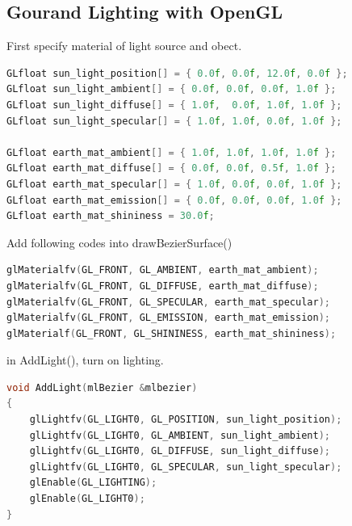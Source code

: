 \documentclass[acmtog]{acmart}
\begin{document}
\subsection{Gourand Lighting with OpenGL}
First specify material of light source and obect.
\begin{lstlisting}[frame=single,breaklines=true,language=c++,basicstyle=\footnotesize\ttfamily]
GLfloat sun_light_position[] = { 0.0f, 0.0f, 12.0f, 0.0f };
GLfloat sun_light_ambient[] = { 0.0f, 0.0f, 0.0f, 1.0f };
GLfloat sun_light_diffuse[] = { 1.0f,  0.0f, 1.0f, 1.0f };
GLfloat sun_light_specular[] = { 1.0f, 1.0f, 0.0f, 1.0f };

GLfloat earth_mat_ambient[] = { 1.0f, 1.0f, 1.0f, 1.0f };
GLfloat earth_mat_diffuse[] = { 0.0f, 0.0f, 0.5f, 1.0f };
GLfloat earth_mat_specular[] = { 1.0f, 0.0f, 0.0f, 1.0f };
GLfloat earth_mat_emission[] = { 0.0f, 0.0f, 0.0f, 1.0f };
GLfloat earth_mat_shininess = 30.0f;
\end{lstlisting}
\par Add following codes into drawBezierSurface()
\begin{lstlisting}[frame=single,breaklines=true,language=c++,basicstyle=\footnotesize\ttfamily]
glMaterialfv(GL_FRONT, GL_AMBIENT, earth_mat_ambient);
glMaterialfv(GL_FRONT, GL_DIFFUSE, earth_mat_diffuse);
glMaterialfv(GL_FRONT, GL_SPECULAR, earth_mat_specular);
glMaterialfv(GL_FRONT, GL_EMISSION, earth_mat_emission);
glMaterialf(GL_FRONT, GL_SHININESS, earth_mat_shininess);
\end{lstlisting}
\par in AddLight(), turn on lighting.
\begin{lstlisting}[frame=single,breaklines=true,language=c++,basicstyle=\footnotesize\ttfamily]
void AddLight(mlBezier &mlbezier)
{
	glLightfv(GL_LIGHT0, GL_POSITION, sun_light_position);
	glLightfv(GL_LIGHT0, GL_AMBIENT, sun_light_ambient);
	glLightfv(GL_LIGHT0, GL_DIFFUSE, sun_light_diffuse);
	glLightfv(GL_LIGHT0, GL_SPECULAR, sun_light_specular);
	glEnable(GL_LIGHTING);
	glEnable(GL_LIGHT0);
}
\end{lstlisting}
\end{document}
